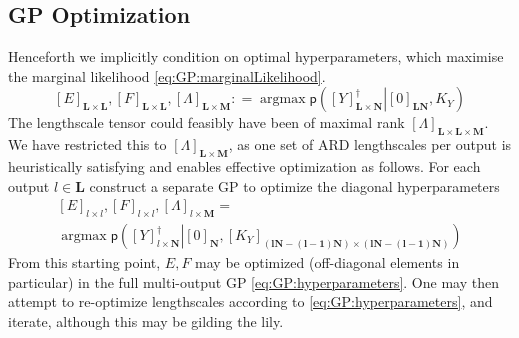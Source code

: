 \documentclass[preprint,12pt]{elsarticle}
\newcommand*{\M}[1]{\ensuremath{#1}\xspace}
\newcommand*{\x}{\times}
\newcommand*{\mi}[1]{\mathbf{#1}}
\newcommand*{\te}[2][]{\left\lbrack{#2}\right\rbrack_{#1}}
\newcommand*{\prob}[3]{\M{\mathsf{p}\!\left(\left.{#1}\right\vert{#2,#3}\right)}}
\newcommand*{\deq}{\M{\mathrel{\mathop:}=}}
\DeclareMathOperator*{\argmax}{argmax}
\begin{document}
        \subsection{GP Optimization} \label{sub:GP:Optimization}
            Henceforth we implicitly condition on optimal hyperparameters, which maximise the marginal likelihood \cref{eq:GP:marginalLikelihood}.
            \begin{equation} \label{eq:GP:hyperparameters}
                \te[\mi{L}\x\mi{L}]{E},\te[\mi{L}\x\mi{L}]{F},\te[\mi{L}\x\mi{M}]{\Lambda} \deq \argmax \prob{\te[\mi{L\x N}]{Y}^{\dagger}}{\te[\mi{LN}]{0}}{K_Y}
            \end{equation}
            The lengthscale tensor could feasibly have been of maximal rank $\te[\mi{L}\x\mi{L}\x\mi{M}]{\Lambda}$. We have restricted this to $\te[\mi{L}\x\mi{M}]{\Lambda}$, as one set of ARD lengthscales per output is heuristically satisfying and enables effective optimization as follows.
            For each output $l \in \mi{L}$ construct a separate GP to optimize the diagonal hyperparameters
            \begin{multline*}
                \te[l\x l]{E},\te[l\x l]{F},\te[l\x\mi{M}]{\Lambda} = \\
                \argmax \prob{\te[l\x \mi{N}]{Y}^{\dagger}}{\te[\mi{N}]{0}}{\te[(\mi{lN-(l-1)N})\x (\mi{lN-(l-1)N})]{K_Y}}
            \end{multline*}
            From this starting point, $E,F$ may be optimized (off-diagonal elements in particular) in the full multi-output GP \cref{eq:GP:hyperparameters}. One may then attempt to re-optimize lengthscales according to \cref{eq:GP:hyperparameters}, and iterate, although this may be gilding the lily.
\end{document}
